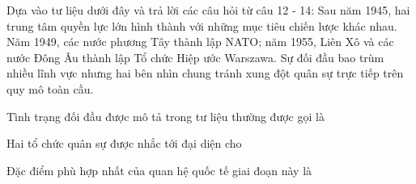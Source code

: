 \begin{baidoc}
\item[] Dựa vào tư liệu dưới đây và trả lời các câu hỏi từ câu 12 - 14:
Sau năm 1945, hai trung tâm quyền lực lớn hình thành với những mục tiêu chiến lược khác nhau. Năm 1949, các nước phương Tây thành lập NATO; năm 1955, Liên Xô và các nước Đông Âu thành lập Tổ chức Hiệp ước Warszawa. Sự đối đầu bao trùm nhiều lĩnh vực nhưng hai bên nhìn chung tránh xung đột quân sự trực tiếp trên quy mô toàn cầu.

\begin{ex}
Tình trạng đối đầu được mô tả trong tư liệu thường được gọi là
\end{ex}

\begin{ex}
Hai tổ chức quân sự được nhắc tới đại diện cho
\end{ex}

\begin{ex}
Đặc điểm phù hợp nhất của quan hệ quốc tế giai đoạn này là
\end{ex}
\end{baidoc}

